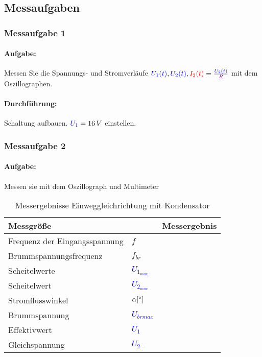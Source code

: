 \documentclass[11pt,a4paper,titlepage]{scrreprt}
\newcommand{\spannung}[1]{\textcolor{blue}{#1}}
\newcommand{\strom}[1]{\textcolor{red}{#1}}
\newcommand{\widerstand}[1]{\textcolor{violet}{#1}}
\begin{document}
			\subsection{Messaufgaben}
				\subsubsection{Messaufgabe 1}
					\paragraph{Aufgabe:} Messen Sie die Spannungs- und Stromverläufe  $\spannung{U_1(t)}, \spannung{U_2(t)}, \strom{I_2(t)} = \frac{\spannung{U_2(t)}}{\widerstand{R}}$ mit dem Oszillographen.
					\paragraph{Durchführung:} Schaltung aufbauen. $\spannung{U_1} = 16\,V$ einstellen.\\ 		

				\subsubsection{Messaufgabe 2}
					\paragraph{Aufgabe:} Messen sie mit dem Oszillograph und Multimeter
					\begin{table}[!hbtp]
						\caption{Messergebnisse Einweggleichrichtung mit Kondensator}
						\label{tbl:messergebnisse1.2}
						\renewcommand{\arraystretch}{1.3}
						\begin{tabular}{ll|l}
							\multicolumn{2}{l}{\textbf{Messgröße}} & \textbf{Messergebnis}\\ \hline
							Frequenz der Eingangsspannung & $f$ & \\
							Brummspannungsfrequenz & $f_{br}$ &\\
							Scheitelwerte & \spannung{$U_{1_{max}}$} &\\
							Scheitelwert & \spannung{$U_{2_{max}}$} &\\
							Stromflusswinkel &  $\alpha [ \degree]$&\\
							Brummspannung &  \spannung{$U_{brmax}$} &\\ \hline
							Effektivwert & \spannung{$U_{1}$} &\\
							Gleichspannung & \spannung{$U_{2-}$} &\\
						\end{tabular}
					\end{table}
\end{document}
